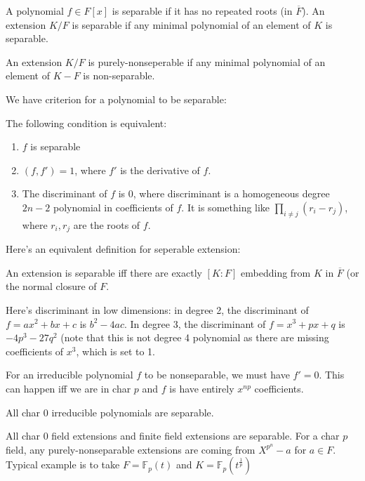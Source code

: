 \documentclass[main.tex]{subfiles}
\begin{document}
\begin{definition}
A polynomial $f \in F[x]$ is separable if it has no repeated roots (in $\overline{F}$).
An extension $K/F$ is separable if any minimal polynomial of an element of $K$ is separable. 

An extension $K/F$ is purely-nonseperable if any minimal polynomial of an element of $K - F$ is non-separable.
\end{definition}

We have criterion for a polynomial to be separable:
\begin{lemma}
The following condition is equivalent:
\begin{enumerate}
    \item $f$ is separable
    \item $(f, f') = 1$, where $f'$ is the derivative of $f$.
    \item The discriminant of $f$ is 0, where discriminant is a homogeneous degree $2n-2$ polynomial in coefficients of $f$. It is something like $\prod_{i \neq j} (r_i - r_j)$, where $r_i, r_j$ are the roots of $f$.
\end{enumerate}
\end{lemma}

Here's an equivalent definition for seperable extension:

\begin{lemma}
An extension is separable iff there are exactly $[K:F]$ embedding from $K$ in $\overline{F}$ (or the normal closure of $F$.
\end{lemma}

Here's discriminant in low dimensions: in degree 2, the discriminant of $f = ax^2 + bx + c$ is $b^2 - 4ac$. In degree 3, the discriminant of $f = x^3 + px + q$ is $-4 p^3 - 27 q^2$ (note that this is not degree 4 polynomial as there are missing coefficients of $x^3$, which is set to 1.

For an irreducible polynomial $f$ to be nonseparable, we must have $f' = 0$. This can happen iff we are in char $p$ and $f$ is have entirely $x^{np}$ coefficients. 

\begin{example}
All char $0$ irreducible polynomials are separable. 

All char 0 field extensions and finite field extensions are separable. For a char $p$ field, any purely-nonseparable extensions are coming from $X^{p^n} - a$ for $a \in F$. 
Typical example is to take $F = \mathbb{F}_p (t)$ and $K = \mathbb{F}_p (t^{\frac{1}{p}})$
\end{example}
\end{document}
